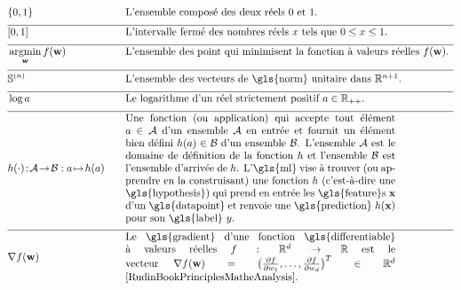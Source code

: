\newpage
\begin{align}
		&\{0,1\}& \quad & \mbox{L'ensemble composé des deux réels $0$ et $1$.} \nonumber \\[2mm] \hline \nonumber\\[-5mm]
	&[0,1] &\quad &\mbox{L'intervalle fermé des nombres réels $x$ tels que $0 \leq x \leq 1$. }\nonumber \\[2mm] \hline \nonumber\\[-5mm]
    &\argmin_{\weights} f(\weights) &\quad &\mbox{L'ensemble des point qui minimisent la fonction à valeurs réelles $f(\weights)$.  } \nonumber \\[2mm] \hline \nonumber\\[-5mm]
    &\sphere{\nrnodes} &\quad &\mbox{L'ensemble des vecteurs de \gls{norm} unitaire dans $\mathbb{R}^{\nrnodes+1}$.  }\nonumber \\[2mm] \hline \nonumber\\[-5mm]
	 &\log a &\quad &\mbox{Le logarithme d'un réel strictement positif $a \in \mathbb{R}_{++}$.  } \nonumber \\[2mm] \hline \nonumber\\[-5mm]
	 &\hypothesis(\cdot)\!:\!\mathcal{A}\!\rightarrow\!\mathcal{B} :  a \!\mapsto\!h(a) &\quad &\parbox{.75\textwidth}{
	 	Une fonction (ou application) qui accepte tout élément \( a \in \mathcal{A} \) d'un ensemble \( \mathcal{A} \) en entrée et fournit un élément bien défini \( h(a) \in \mathcal{B} \) d'un ensemble \( \mathcal{B} \). L'ensemble \( \mathcal{A} \) est le domaine de définition de la fonction \( h \) et l'ensemble \( \mathcal{B} \) est l'ensemble d'arrivée de \( \hypothesis \). L'\gls{ml} vise à trouver (ou apprendre en la construisant) une fonction \( \hypothesis \) (c'est-à-dire une \gls{hypothesis}) qui prend en entrée les \gls{feature}s \( \featurevec \) d'un \gls{datapoint} et renvoie une \gls{prediction} \( \hypothesis(\featurevec) \) pour son \gls{label} \( \truelabel \).
 	} \nonumber \\[2mm] \hline \nonumber\\[-5mm]
	 	&\nabla f(\weights) & \quad & \parbox{.75\textwidth}{Le  \gls{gradient} d'une fonction \gls{differentiable} à valeurs réelles
	 	$f: \mathbb{R}^{\featuredim}\rightarrow \mathbb{R}$ est le vecteur
	 	$\nabla f(\weights) = \big( \frac{\partial f}{\partial \weight_{1}},\ldots,\frac{\partial f}{\partial \weight_{\featuredim}}  \big)^{T} \in \mathbb{R}^{\featuredim}$ \cite[Ch. 9]{RudinBookPrinciplesMatheAnalysis}.}   \nonumber
\end{align} 
